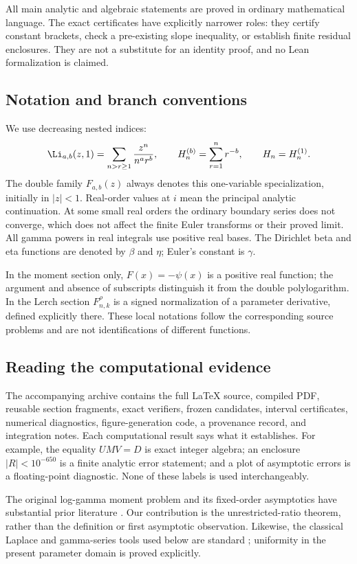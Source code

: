 All main analytic and algebraic statements are proved in ordinary
mathematical language. The exact certificates have explicitly narrower
roles: they certify constant brackets, check a pre-existing slope
inequality, or establish finite residual enclosures. They are not a
substitute for an identity proof, and no Lean formalization is claimed.

\subsection{Notation and branch conventions}

We use decreasing nested indices:
\[
 \Li_{a,b}(z,1)=\sum_{n>r\ge1}\frac{z^n}{n^a r^b},\qquad
 H_n^{(b)}=\sum_{r=1}^n r^{-b},\qquad H_n=H_n^{(1)}.
\]
The double family $F_{a,b}(z)$ always denotes this one-variable
specialization, initially in $|z|<1$. Real-order values at $i$ mean
the principal analytic continuation. At some small real orders the
ordinary boundary series does not converge, which does not affect the
finite Euler transforms or their proved limit. All gamma powers in real
integrals use positive real bases. The Dirichlet beta and eta functions
are denoted by $\beta$ and $\eta$; Euler's constant is $\gamma$.

In the moment section only, $F(x)=-\psi(x)$ is a positive real function;
the argument and absence of subscripts distinguish it from the double
polylogarithm. In the Lerch section $F_{n,k}^\rho$ is a signed normalization
of a parameter derivative, defined explicitly there. These local
notations follow the corresponding source problems and are not
identifications of different functions.

\subsection{Reading the computational evidence}

The accompanying archive contains the full LaTeX source, compiled PDF,
reusable section fragments, exact verifiers, frozen candidates, interval
certificates, numerical diagnostics, figure-generation code, a provenance
record, and integration notes. Each computational result says what it
establishes. For example, the equality $UMV=D$ is exact integer algebra;
an enclosure $|R|<10^{-650}$ is a finite analytic error statement; and
a plot of asymptotic errors is a floating-point diagnostic. None of these
labels is used interchangeably.

The original log-gamma moment problem and its fixed-order asymptotics
have substantial prior literature \cite{Amdeberhan,Bailey}. Our contribution
is the unrestricted-ratio theorem, rather than the definition or first
asymptotic observation. Likewise, the classical Laplace and gamma-series
tools used below are standard \cite{DLMFLaplace,DLMFGamma}; uniformity in
the present parameter domain is proved explicitly.
